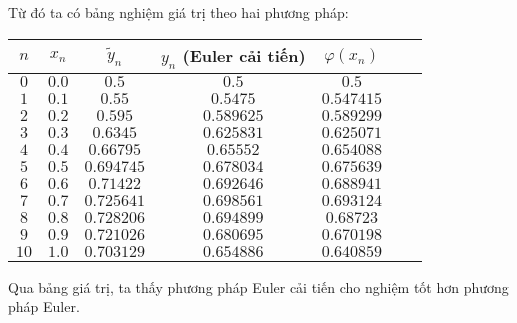 Từ đó ta có bảng nghiệm giá trị theo hai phương pháp:\par
\begin{center}\begin{tabular}{|c|c|c|c|c|c|c|}\hline
	$n$  & $x_n$ & $\tilde{y}_n$ & $y_{n}$ (Euler cải tiến) & $\varphi(x_n)$ \\ \hline
	$0$  & $0.0$ & $0.5$         & $0.5$      & $0.5$      \\ \hline
	$1$  & $0.1$ & $0.55$        & $0.5475$   & $0.547415$ \\ \hline
	$2$  & $0.2$ & $0.595$       & $0.589625$ & $0.589299$ \\ \hline
	$3$  & $0.3$ & $0.6345$      & $0.625831$ & $0.625071$ \\ \hline
	$4$  & $0.4$ & $0.66795$     & $0.65552$  & $0.654088$ \\ \hline
	$5$  & $0.5$ & $0.694745$    & $0.678034$ & $0.675639$ \\ \hline
	$6$  & $0.6$ & $0.71422$     & $0.692646$ & $0.688941$ \\ \hline
	$7$  & $0.7$ & $0.725641$    & $0.698561$ & $0.693124$ \\ \hline
	$8$  & $0.8$ & $0.728206$    & $0.694899$ & $0.68723$  \\ \hline
	$9$  & $0.9$ & $0.721026$    & $0.680695$ & $0.670198$ \\ \hline
	$10$ & $1.0$ & $0.703129$    & $0.654886$ & $0.640859$ \\ \hline
\end{tabular}\end{center}
Qua bảng giá trị, ta thấy phương pháp Euler cải tiến cho nghiệm tốt hơn phương pháp Euler.

